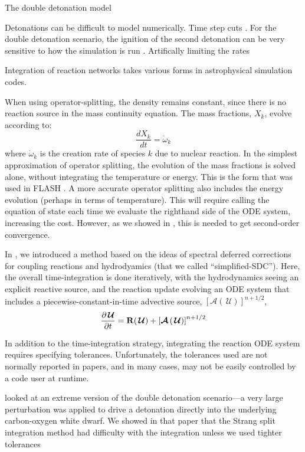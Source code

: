 \documentclass[linenumbers,trackchanges]{aastex631}
\newcommand{\omegadot}{\dot{\omega}}
\newcommand{\ddt}[1]{{\frac{{\partial#1}}{\partial t}}}
\newcommand{\Uc}{{\,\bm{\mathcal{U}}}}
\newcommand{\Rb}{{\bf R}}
\newcommand{\Adv}[1]{{\left [\boldsymbol{\mathcal{A}} \left(#1\right)\right]}}
\newcommand{\MarginPar}[1]{
    \marginpar{\vskip-\baselineskip%
               \raggedright%
               \tiny\sffamily%
               {\color{red}\hrule%
               \smallskip%
               #1\par%
               \smallskip%
               \hrule}}%
}
\begin{document}
The double detonation model

Detonations can be difficult to model numerically.  Time step cuts \MarginPar{ref}.
For the double detonation scenario, the ignition of the second detonation
can be very sensitive to how the simulation is run \MarginPar{refs}.
Artifically limiting the rates \MarginPar{ref}

Integration of reaction networks takes various forms in astrophysical
simulation codes.

When using operator-splitting, the density remains constant, since there
is no reaction source in the mass continuity equation.  The mass
fractions, $X_k$, evolve according to:
\begin{equation}
\frac{dX_k}{dt} = \omegadot_k
\end{equation}
where $\omegadot_k$ is the creation rate of species $k$ due to nuclear
reaction.  In the simplest approximation of operator splitting, the
evolution of the mass fractions is solved alone, without integrating
the temperature or energy.  This is the form that was used in FLASH
\cite{flash}.  A more accurate operator splitting also includes the
energy evolution (perhaps in terms of temperature).  This will require
calling the equation of state each time we evaluate the righthand side
of the ODE system, increasing the cost.  However, as we showed in
\citet{strang_rnaas}, this is needed to get second-order convergence.

In \citet{castro_simple_sdc}, we introduced a method based on the
ideas of spectral deferred corrections for coupling reactions and
hydrodyamics (that we called ``simplified-SDC'').  Here, the overall
time-integration is done iteratively, with the hydrodynamics seeing an
explicit reactive source, and the reaction update evolving an ODE
system that includes a piecewise-constant-in-time advective source,
$\Adv{\Uc}^{n+1/2}$,
\begin{equation}
\ddt{\Uc} = \Rb(\Uc) + \Adv{\Uc}^{n+1/2}
\end{equation}

In addition to the time-integration strategy, integrating the reaction
ODE system requires specifying tolerances.  Unfortunately, the tolerances
used are not normally reported in papers, and in many cases, may not
be easily controlled by a code user at runtime.



\citet{castro_simple_sdc} looked at an extreme version of the
double detonation scenario---a very large perturbation was applied
to drive a detonation directly into the underlying
carbon-oxygen white dwarf.  We showed in that paper that the Strang
split integration method had difficulty with the integration unless
we used tighter tolerances
\end{document}
